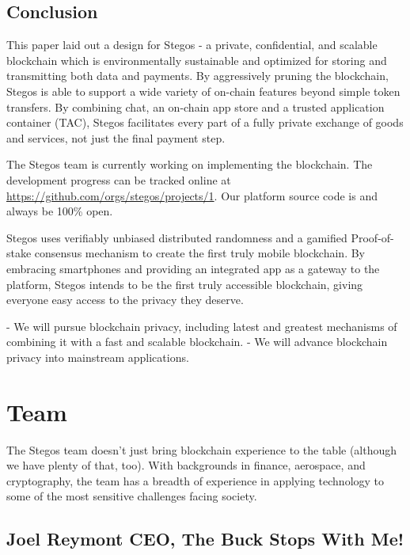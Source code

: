 \documentclass[8pt,fleqn,openany]{book}
\begin{document}
	\section{Conclusion}
	This paper laid out a design for Stegos - a private, confidential, and scalable blockchain which is environmentally sustainable and optimized for storing and transmitting both data and payments. By aggressively pruning the blockchain, Stegos is able to support a wide variety of on-chain features beyond simple token transfers. By combining chat, an on-chain app store and a trusted application container (TAC), Stegos facilitates every part of a fully private exchange of goods and services, not just the final payment step.
	
	The Stegos team is currently working on implementing the blockchain. The development progress can be tracked online at \url{https://github.com/orgs/stegos/projects/1}. Our platform source code is and always be 100\% open.
	
	Stegos uses verifiably unbiased distributed randomness and a gamified Proof-of-stake consensus mechanism to create the first truly mobile blockchain. By embracing smartphones and providing an integrated app as a gateway to the platform, Stegos intends to be the first truly accessible blockchain, giving everyone easy access to the privacy they deserve.     
	
	- We will pursue blockchain privacy, including latest and greatest mechanisms of combining it with a fast and scalable blockchain.
	- We will advance blockchain privacy into mainstream applications.
	
	\chapter{Team}\label{app:team}
	
	The Stegos team doesn’t just bring blockchain experience to the table (although we have plenty of that, too). With backgrounds in finance, aerospace, and cryptography, the team has a breadth of experience in applying technology to some of the most sensitive challenges facing society.
	
	\section{Joel Reymont CEO, The Buck Stops With Me!}
	
\end{document}
